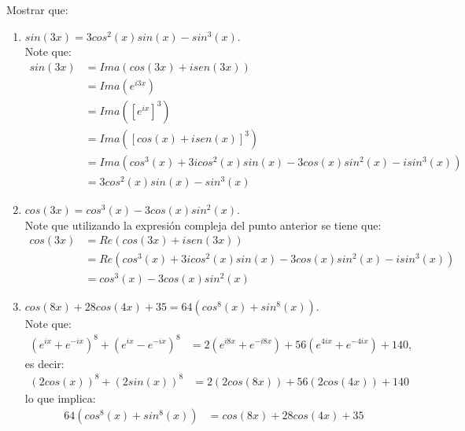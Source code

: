 \begin{homeworkProblem}
  Mostrar que:
  \begin{solution}
    \begin{enumerate}
      \item $sin(3x)=3cos^2(x)sin(x)-sin^3(x)$.\\
        Note que:
        \begin{align*}
          sin(3x)&=Ima(cos(3x)+isen(3x))\\
          &=Ima(e^{i3x})\\
          &=Ima([e^{ix}]^3)\\
          &=Ima([cos(x)+isen(x)]^3)\\
          &=Ima(cos^3(x) + 3icos^2(x)sin(x) - 3cos(x)sin^2(x) - isin^3(x))\\
          &=3cos^2(x)sin(x)-sin^3(x)
        \end{align*}
      \item $cos(3x)=cos^3(x)-3cos(x)sin^2(x)$.\\
        Note que utilizando la expresión compleja del punto anterior se tiene que:
        \begin{align*}
          cos(3x)&=Re(cos(3x)+isen(3x))\\
          &=Re(cos^3(x) + 3icos^2(x)sin(x) - 3cos(x)sin^2(x) - isin^3(x))\\
          &=cos^3(x)-3cos(x)sin^2(x)
        \end{align*}
      \item $cos(8x)+28cos(4x)+35=64(cos^8(x)+sin^8(x))$.\\
      Note que:
      \begin{align*}
        (e^{ix}+e^{-ix})^{8}+(e^{ix}-e^{-ix})^{8}&=2(e^{i8x} + e^{-i8x})+ 56(e^{4ix} + e^{-4ix}) + 140,
      \end{align*}
      es decir:
      \begin{align*}
        (2cos(x))^{8}+(2sin(x))^{8}&= 2(2cos(8x)) + 56(2cos(4x)) + 140
      \end{align*}
      lo que implica:
      \begin{align*}
        64(cos^{8}(x)+sin^{8}(x))&=cos(8x)+28cos(4x)+35
      \end{align*}
    \end{enumerate}
  \end{solution}
\end{homeworkProblem}
